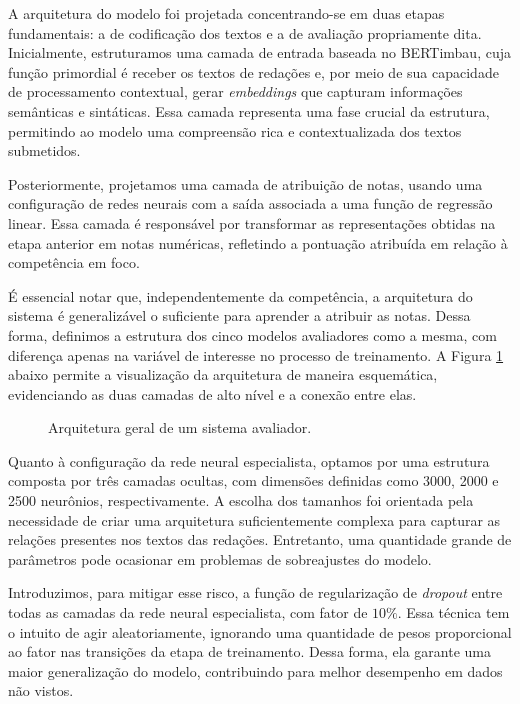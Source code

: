 A arquitetura do modelo foi projetada concentrando-se em duas etapas fundamentais: a de codificação dos textos e a de avaliação propriamente dita. Inicialmente, estruturamos uma camada de entrada baseada no BERTimbau, cuja função primordial é receber os textos de redações e, por meio de sua capacidade de processamento contextual, gerar \textit{embeddings} que capturam informações semânticas e sintáticas. Essa camada representa uma fase crucial da estrutura, permitindo ao modelo uma compreensão rica e contextualizada dos textos submetidos.

Posteriormente, projetamos uma camada de atribuição de notas, usando uma configuração de redes neurais com a saída associada a uma função de regressão linear. Essa camada é responsável por transformar as representações obtidas na etapa anterior em notas numéricas, refletindo a pontuação atribuída em relação à competência em foco.

É essencial notar que, independentemente da competência, a arquitetura do sistema é generalizável o suficiente para aprender a atribuir as notas. Dessa forma, definimos a estrutura dos cinco modelos avaliadores como a mesma, com diferença apenas na variável de interesse no processo de treinamento. A Figura \ref{fig:full_architecture} abaixo permite a visualização da arquitetura de maneira esquemática, evidenciando as duas camadas de alto nível e a conexão entre elas.

\begin{figure}[H]
    \caption{Arquitetura geral de um sistema avaliador.}
    \label{fig:full_architecture}
    \centering
    \resizebox{\textwidth}{!}{}
\end{figure}

Quanto à configuração da rede neural especialista, optamos por uma estrutura composta por três camadas ocultas, com dimensões definidas como 3000, 2000 e 2500 neurônios, respectivamente. A escolha dos tamanhos foi orientada pela necessidade de criar uma arquitetura suficientemente complexa para capturar as relações presentes nos textos das redações. Entretanto, uma quantidade grande de parâmetros pode ocasionar em problemas de sobreajustes do modelo.

Introduzimos, para mitigar esse risco, a função de regularização de \textit{dropout} entre todas as camadas da rede neural especialista, com fator de $10\%$. Essa técnica tem o intuito de agir aleatoriamente, ignorando uma quantidade de pesos proporcional ao fator nas transições da etapa de treinamento. Dessa forma, ela garante uma maior generalização do modelo, contribuindo para melhor desempenho em dados não vistos.

